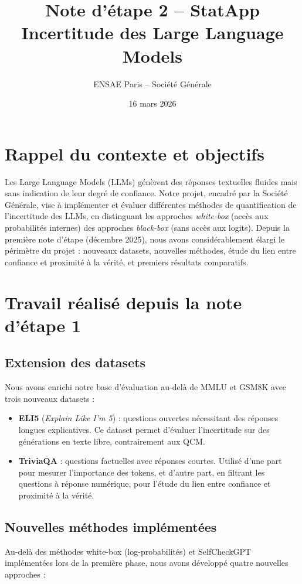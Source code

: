 \documentclass[a4paper, 11pt]{article}
\title{\textbf{Note d'étape 2 -- StatApp}\\
\large Incertitude des Large Language Models}
\author{ENSAE Paris -- Société Générale}
\date{16 mars 2026}
\begin{document}
\maketitle
\section{Rappel du contexte et objectifs}
Les Large Language Models (LLMs) génèrent des réponses textuelles fluides mais sans indication de leur degré de confiance. Notre projet, encadré par la Société Générale, vise à implémenter et évaluer différentes méthodes de quantification de l'incertitude des LLMs, en distinguant les approches \emph{white-box} (accès aux probabilités internes) des approches \emph{black-box} (sans accès aux logits). Depuis la première note d'étape (décembre 2025), nous avons considérablement élargi le périmètre du projet : nouveaux datasets, nouvelles méthodes, étude du lien entre confiance et proximité à la vérité, et premiers résultats comparatifs.
\section{Travail réalisé depuis la note d'étape 1}
\subsection{Extension des datasets}
Nous avons enrichi notre base d'évaluation au-delà de MMLU et GSM8K avec trois nouveaux datasets :
\begin{itemize}[nosep]
    \item \textbf{ELI5} (\emph{Explain Like I'm 5}) : questions ouvertes nécessitant des réponses longues explicatives. Ce dataset permet d'évaluer l'incertitude sur des générations en texte libre, contrairement aux QCM.
    \item \textbf{TriviaQA} : questions factuelles avec réponses courtes. Utilisé d'une part pour mesurer l'importance des tokens, et d'autre part, en filtrant les questions à réponse numérique, pour l'étude du lien entre confiance et proximité à la vérité.

\end{itemize}
\subsection{Nouvelles méthodes implémentées}
Au-delà des méthodes white-box (log-probabilités) et SelfCheckGPT implémentées lors de la première phase, nous avons développé quatre nouvelles approches :
\end{document}
